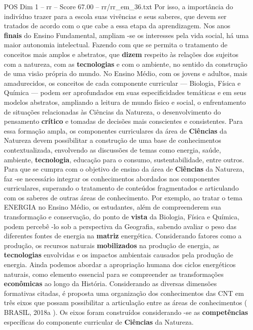 \begin{textsample}{POS Dim 1 – rr – Score 67.00 – rr/rr\_em\_36.txt}
Por isso, a importância do indivíduo trazer para a escola suas vivências e seus saberes, que devem ser tratados de acordo com o que cabe a essa etapa da aprendizagem.
Nos anos \textbf{finais} do Ensino Fundamental, ampliam -se os interesses pela vida social, há uma maior autonomia intelectual.
Fazendo com que se permita o tratamento de conceitos mais amplos e abstratos, que \textbf{dizem} respeito às relações dos sujeitos com a natureza, com as \textbf{tecnologias} e com o ambiente, no sentido da construção de uma visão própria do mundo.
No Ensino Médio, com os jovens e adultos, mais amadurecidos, os conceitos de cada componente curricular — Biologia, Física e Química — podem ser aprofundados em suas especificidades temáticas e em seus modelos abstratos, ampliando a leitura de mundo físico e social, o enfrentamento de situações relacionadas às Ciências da Natureza, o desenvolvimento do pensamento \textbf{crítico} e tomadas de decisões mais conscientes e consistentes.
Para essa formação ampla, os componentes curriculares da área de \textbf{Ciências} da Natureza devem possibilitar a construção de uma base de conhecimentos contextualizada, envolvendo as discussões de temas como energia, saúde, ambiente, \textbf{tecnologia}, educação para o consumo, sustentabilidade, entre outros.
Para que se cumpra com o objetivo de ensino da área de \textbf{Ciências} da Natureza, faz -se necessário integrar os conhecimentos abordados nos componentes curriculares, superando o tratamento de conteúdos fragmentados e articulando com os saberes de outras áreas de conhecimento.
Por exemplo, ao tratar o tema ENERGIA no Ensino Médio, os estudantes, além de compreenderem sua transformação e conservação, do ponto de \textbf{vista} da Biologia, Física e Química, podem percebê -lo sob a perspectiva da Geografia, sabendo avaliar o peso das diferentes fontes de energia na \textbf{matriz} energética.
Considerando fatores como a produção, os recursos naturais \textbf{mobilizados} na produção de energia, as \textbf{tecnologias} envolvidas e os impactos ambientais causados pela produção de energia.
Ainda podemos abordar a apropriação humana dos ciclos energéticos naturais, como elemento essencial para se compreender as transformações \textbf{econômicas} ao longo da História.
Considerando as diversas dimensões formativas citadas, é proposta uma organização dos conhecimentos das CNT em três eixos que possam possibilitar a articulação entre as áreas de conhecimentos ( BRASIL, 2018a ).
Os eixos foram construídos considerando -se as \textbf{competências} específicas do componente curricular de \textbf{Ciências} da Natureza.

\end{textsample}
